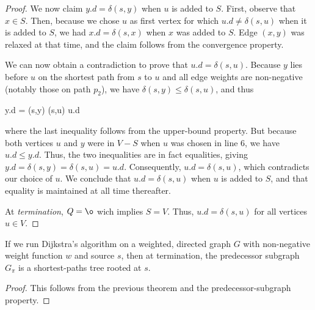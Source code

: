 \begin{proof}
  We now claim $y.d = \delta(s,y)$ when $u$ is added to $S$. First, observe that $x \in S$. Then, because we chose $u$ as first vertex for which $u.d \neq \delta(s,u)$ when it is added to $S$, we had $x.d = \delta(s,x)$ when $x$ was added to $S$. Edge $(x,y)$ was relaxed at that time, and the claim follows from the convergence property.

  We can now obtain a contradiction to prove that $u.d = \delta(s,u)$. Because $y$ lies before $u$ on the shortest path from $s$ to $u$ and all edge weights are non-negative (notably those on path $p_2$), we have $\delta(s,y) \leq \delta(s,u)$, and thus

  \bee
  y.d = \delta(s,y) \leq \delta(s,u) \leq u.d
  \eee

  where the last inequality follows from the upper-bound property. But because both vertices $u$ and $y$ were in $V-S$ when $u$ was chosen in line $6$, we have $u.d \leq y.d$. Thus, the two inequalities are in fact equalities, giving $y.d = \delta(s,y) = \delta(s,u) = u.d$. Consequently, $u.d = \delta(s,u)$, which contradicts our choice of $u$. We conclude that $u.d = \delta(s,u)$ when $u$ is added to $S$, and that equality is maintained at all time thereafter.
  
  At \emph{termination}, $Q = \o$ wich implies $S = V$. Thus, $u.d = \delta(s,u)$ for all vertices $u \in V$.
  
\end{proof}

\begin{theorem} If we run Dijkstra's algorithm on a weighted, directed graph $G$ with non-negative weight function $w$ and source $s$, then at termination, the predecessor subgraph $G_\pi$ is a shortest-paths tree rooted at $s$.
\end{theorem}

\begin{proof}
  This follows from the previous theorem and the predecessor-subgraph property.
\end{proof}

